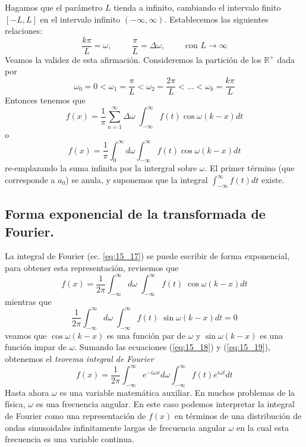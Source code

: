Hagamos que el parámetro $L$ tienda a infinito, cambiando el intervalo finito $[-L,L]$ en el intervalo infinito $(-\infty, \infty)$. Establecemos las siguientes relaciones:
\[ \dfrac{k \pi}{L} = \omega, \hspace{1cm} \dfrac{\pi}{L} = \Delta \omega, \hspace{1cm} \mbox{con } L \to \infty \]
Veamos la validez de esta afirmación. Consideremos la partición de los $\mathbb{R}^{+}$ dada por
\begin{equation}
\omega_{0} = 0 < \omega_{1} = \dfrac{\pi}{L} < \omega_{2} = \dfrac{2 \pi}{L} < \ldots < \omega_{k} = \dfrac{k \pi}{L}
\label{eq:8_16}
\end{equation}
Entonces tenemos que
\begin{equation}
f(x) = \dfrac{1}{\pi} \sum_{n=1}^{\infty} \Delta \omega \; \int_{-\infty}^{\infty} f(t) \cos \omega (k - x) dt
\label{eq:15_16}
\end{equation}
o 
\begin{equation}
f(x) = \dfrac{1}{\pi} \int_{0}^{\infty} d \omega \int_{-\infty}^{\infty} f(t) \cos \omega (k - x) dt
\label{eq:15_17}
\end{equation}
re-emplazando la suma infinita por la intergral sobre $\omega$. El primer término (que corresponde a $a_{0}$) se anula, y suponemos que la integral $\int_{-\infty}^{\infty} f(t) dt$ existe.
\subsection{Forma exponencial de la transformada de Fourier.}
La integral de Fourier (ec. \ref{eq:15_17}) se puede escribir de forma exponencial, para obtener esta representación, revisemos que
\begin{equation}
f(x) =  \dfrac{1}{2 \pi} \int_{- \infty}^{\infty} d \omega \; \int_{-\infty}^{\infty} f(t) \; \cos \omega (k - x) dt
\label{eq:15_18}
\end{equation}
mientras que
\begin{equation}
\dfrac{1}{2 \pi} \int_{-\infty}^{\infty} d \omega \; \int_{-\infty}^{\infty} f(t) \; \sin \omega (k - x) dt = 0
\label{eq:15_19}
\end{equation}
veamos que $ \cos \omega (k - x)$ es una función par de $\omega$ y $\sin \omega (k - x)$ es una función impar de $\omega$. Sumando las ecuaciones (\ref{eq:15_18}) y (\ref{eq:15_19}), obtenemos el \emph{teorema integral de Fourier}
\begin{equation}
\boxed{
f(x) = \dfrac{1}{2 \pi} \int_{-\infty}^{\infty} e^{-i \omega x} d \omega \int_{-\infty}^{\infty} f(t) e^{i \omega t} dt }
\label{eq:15_20}
\end{equation}
Hasta ahora $\omega$ es una variable matemática auxiliar. En muchos problemas de la física, $\omega$ es una frecuencia angular. En este caso podemos interpretar la integral de Fourier como una representación de $f(x)$ en términos de una distribución de ondas sinusoidales infinitamente largas de frecuencia angular $\omega$ en la cual esta frecuencia es una variable continua.
